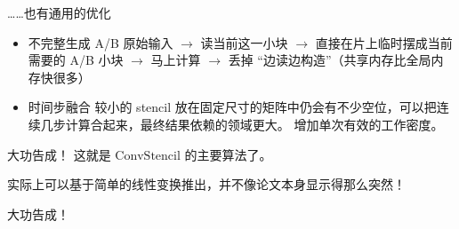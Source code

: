 \documentclass[aspectratio=169,10pt]{beamer}
\begin{document}
\begin{frame}[fragile]{……也有通用的优化}
\begin{itemize}
\item 不完整生成 A/B
原始输入 \ensuremath{\rightarrow} 读当前这一小块 \ensuremath{\rightarrow} 直接在片上临时摆成当前需要的 A/B 小块 \ensuremath{\rightarrow} 马上计算 \ensuremath{\rightarrow} 丢掉
“边读边构造”（共享内存比全局内存快很多）
\item 时间步融合
较小的 stencil 放在固定尺寸的矩阵中仍会有不少空位，可以把连续几步计算合起来，最终结果依赖的领域更大。
增加单次有效的工作密度。
\end{itemize}
\end{frame}

\begin{frame}[fragile]{大功告成！}
这就是 $\text{ConvStencil}$ 的主要算法了。
\par
实际上可以基于简单的线性变换推出，并不像论文本身显示得那么突然！
\par
\end{frame}

\begin{frame}[fragile]{大功告成！}
\mbox{}
\end{frame}
\end{document}
